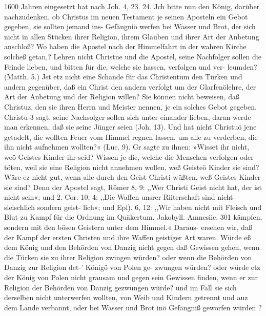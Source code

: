 {    1600 Jahren eingesetzt hat nach Joh. 4, 23. 24.
    Jch bitte nun den König, darüber nachzudenken, ob Christus
    im neuen Testament je seinen Aposteln ein Gebot gegeben, sie
    sollten jemand ins- Gefängniö werfen bei Wasser und Brot, der
    sich nicht in allen Stücken ihrer Religion, ihrem Glauben und
    ihrer Art der Anbetung anschloß? Wo haben die Apostel nach
    der Himmelfahrt in der wahren Kirche solcheß getan,? Lehren
    nicht Christue und die Apostel, seine Nachfolger sollen die Feinde
    lieben, und bitten für die, welche sie hassen, verfolgen und ver-
    leumden? (Matth. 5.)
    Jst etz nicht eine Schande für das Christentum den Türken
    und andern gegenüber, daß ein Christ den andern verfolgt um
    der Glarfenölehre, der Art der Anbetung und der Religion
    willen? Sie können nicht beweisen, daß Christuz, den sie ihren
    Herrn und Meister nennen, je ein solches Gebot gegeben. Christu-3
    sagt, seine Nachsolger sollen sich unter einander lieben, daran
    werde man erkennen, daß sie seine Jünger seien (Joh. 13). Und
    hat nicht Christuö jene getadelt, die wollten Feuer vom Himmel
    regnen lassen, um alle zu verderben, die ihn nicht aufnehmen
    wollten?« (Luc. 9). Gr sagte zu ihnen: »Wisset ihr nicht, weö
    Geistes Kinder ihr seid? Wissen je die, welche die Menschen
    verfolgen oder töten, weil sie eine Religion nicht annehmen
    wollen, weß Geisteö Kinder sie sind? Wäre ez nicht gut,
    wenn alle durch den Geist Christi wüßten, weß Geistes
    Kinder sie sind? Denn der Apostel sagt, Römer 8, 9: ,,Wer
    Christi Geist nicht hat, der ist nicht sein«; und 2. Cor. 10, 4:
    ,,Die Waffen unsrer Riiterschaft sind nicht sleischlich sondern geist-
    lich«; und Epl). 6, 12: ,,Wir haben nicht mit Fleisch und Blut zu
    Kampf für die Ordnung im Quäkertum. Jakobyll. Amnesiie. 301
    kämpfen, sondern mit den bösen Geistern unter dem Himmel.«
    Daraus- ersehen wir, daß der Kampf der ersten Christen und
    ihre Waffen geistiger Art waren. Würde eß dem König und den
    Behörden von Danzig nicht gegen daß Gewissen gehen, wenn die
    Türken sie zu ihrer Religion zwingen würden? oder wenn die
    Behörden von Danzig zur Religion det-’ Königö von Polen ge-
    zwungen würden? oder würde etz der König von Polen nicht
    grausam und gegen sein Gewissen finden, wenn er zur Religion
    der Behörden von Danzig gezwungen würde? und im Fall sie
    sich derselben nicht unterwerfen wollten, von Weib und Kindern
    getrennt und auz dem Lande verbannt, oder bei Wasser und Brot
    inö Gefängniß geworfen würden ?
}
